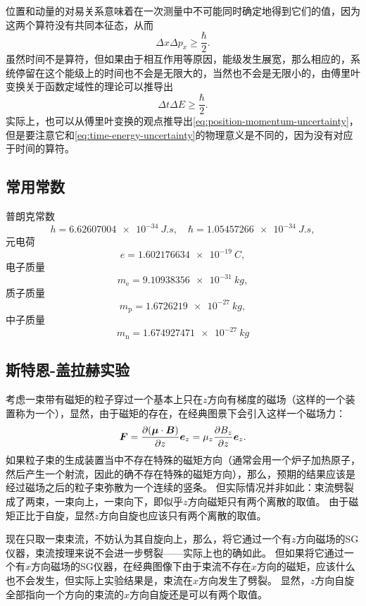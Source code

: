 位置和动量的对易关系意味着在一次测量中不可能同时确定地得到它们的值，因为这两个算符没有共同本征态，从而
\begin{equation}
    \Delta x \Delta p_x \geq \frac{\hbar}{2}.
    \label{eq:position-momentum-uncertainty}
\end{equation}
虽然时间不是算符，但如果由于相互作用等原因，能级发生展宽，那么相应的，系统停留在这个能级上的时间也不会是无限大的，当然也不会是无限小的，由傅里叶变换关于函数定域性的理论可以推导出
\begin{equation}
    \Delta t \Delta E \geq \frac{\hbar}{2}.
    \label{eq:time-energy-uncertainty}
\end{equation}
实际上，也可以从傅里叶变换的观点推导出\eqref{eq:position-momentum-uncertainty}，但是要注意它和\eqref{eq:time-energy-uncertainty}的物理意义是不同的，因为没有对应于时间的算符。

\subsection{常用常数}

普朗克常数
\[
    h = \SI{6.62607004e-34}{J.s}, \quad \hbar = \SI{1.05457266e-34}{J.s},
\]
元电荷
\[
    e = \SI{1.602176634e-19}{C},
\]
电子质量
\[
    m_\text{e} = \SI{9.10938356e-31}{kg},
\]
质子质量
\[
    m_\text{p} = \SI{1.6726219e-27}{kg},
\]
中子质量
\[
    m_\text{n} = \SI{1.674927471e-27}{kg}
\]

\subsection{斯特恩-盖拉赫实验}

考虑一束带有磁矩的粒子穿过一个基本上只在$z$方向有梯度的磁场（这样的一个装置称为一个），显然，由于磁矩的存在，在经典图景下会引入这样一个磁场力：
\begin{equation}
    \vb*{F} = \pdv{(\vb*{\mu} \cdot \vb*{B})}{z} \vb*{e}_z = \mu_z \pdv{B_z}{z} \vb*{e}_z.
\end{equation}
如果粒子束的生成装置当中不存在特殊的磁矩方向（通常会用一个炉子加热原子，然后产生一个射流，因此的确不存在特殊的磁矩方向），那么，预期的结果应该是经过磁场之后的粒子束弥散为一个连续的竖条。
但实际情况并非如此：束流劈裂成了两束，一束向上，一束向下，即似乎$z$方向磁矩只有两个离散的取值。
由于磁矩正比于自旋，显然$z$方向自旋也应该只有两个离散的取值。

现在只取一束束流，不妨认为其自旋向上，那么，将它通过一个有$z$方向磁场的SG仪器，束流按理来说不会进一步劈裂——实际上也的确如此。
但如果将它通过一个有$x$方向磁场的SG仪器，在经典图像下由于束流不存在$x$方向的磁矩，应该什么也不会发生，但实际上实验结果是，束流在$x$方向发生了劈裂。
显然，$z$方向自旋全部指向一个方向的束流的$x$方向自旋还是可以有两个取值。

